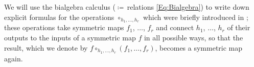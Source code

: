 \documentclass[\MainFolder/Text.tex]{subfiles}
\begin{document}
We will use the bialgebra calculus ($\coloneqq$\,relations \eqref{Eq:Bialgebra}) to write down explicit formulas for the operations $\circ_{h_1, \dotsc, h_r}$ which were briefly introduced in \cite{Cieliebak2015}; these operations take symmetric maps $f_1$, $\dotsc$, $f_r$ and connect $h_1$, $\dotsc$, $h_r$ of their outputs to the inputs of a symmetric map $f$ in all possible ways, so that the result, which we denote by $f\circ_{h_1, \dotsc, h_r}(f_1, \dotsc,f_r)$, becomes a symmetric map again.

\end{document}
